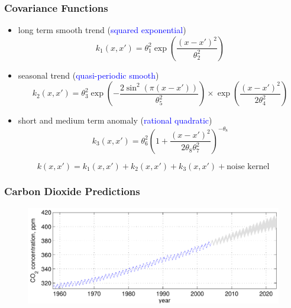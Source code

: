 \documentclass[10pt]{beamer}
\begin{document}
  \begin{frame}
    \frametitle{Covariance Functions}

    \begin{itemize}
      \item long term smooth trend (\textcolor{blue}{squared exponential})
        \begin{equation*}
          k_1(x,x') = \theta_1^2 \exp \left( \frac{(x - x')^2}{\theta_2^2} \right)
        \end{equation*}
      \item seasonal trend (\textcolor{blue}{quasi-periodic smooth})
        \begin{equation*}
          k_2(x,x') = \theta_3^2 \exp \left( - \frac{2 \sin^2 (\pi (x - x'))}{\theta_5^2} \right) \times \exp \left( \frac{(x - x')^2}{2 \theta_4^2} \right)
        \end{equation*}
      \item short and medium term anomaly (\textcolor{blue}{rational quadratic})
        \begin{equation*}
          k_3(x,x') = \theta_6^2 \left( 1 + \frac{(x - x')^2}{2 \theta_8 \theta_7^2} \right)^{- \theta_8}
        \end{equation*}
    \end{itemize}

    \begin{equation*}
      k(x,x') = k_1(x,x') + k_2(x,x') + k_3(x,x') + \text{noise kernel}
    \end{equation*}
  \end{frame}

  \begin{frame}
    \frametitle{Carbon Dioxide Predictions}

    \begin{figure}
      \centering
      \includegraphics[width=\textwidth]{prediction2.png}
    \end{figure}
  \end{frame}
\end{document}
